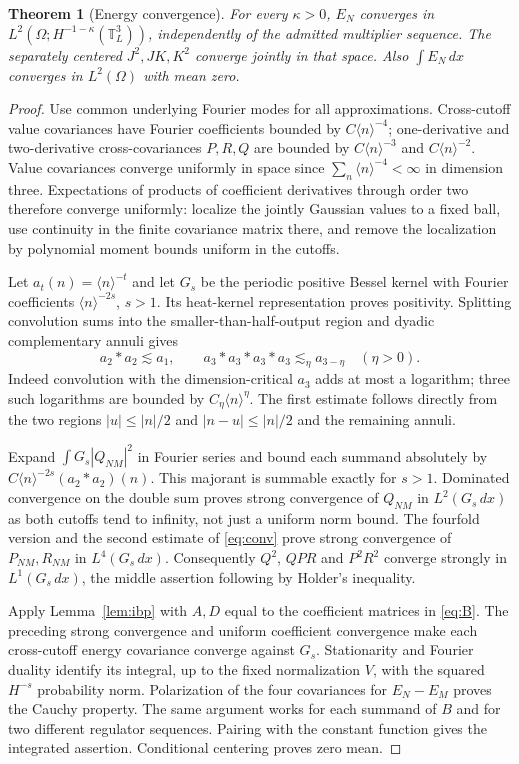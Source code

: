 \documentclass[11pt]{article}
\newtheorem{theorem}{Theorem}[section]
\newcommand{\T}{\mathbb T}
\newcommand{\la}[1]{\langle #1\rangle}
\begin{document}
\begin{theorem}[Energy convergence]\label{thm:energy}
For every $\kappa>0$, $E_N$ converges in
$L^2(\Omega;H^{-1-\kappa}(\T_L^3))$, independently of the admitted
multiplier sequence. The separately centered $J^2,JK,K^2$ converge jointly
in that space. Also $\int E_N\,dx$ converges in $L^2(\Omega)$ with mean zero.
\end{theorem}
\begin{proof}
Use common underlying Fourier modes for all approximations. Cross-cutoff
value covariances have Fourier coefficients bounded by $C\la n^{-4}$;
one-derivative and two-derivative cross-covariances $P,R,Q$ are bounded by
$C\la n^{-3}$ and $C\la n^{-2}$. Value covariances converge uniformly
in space since $\sum_n\la n^{-4}<\infty$ in dimension three.
Expectations of products of coefficient derivatives through order two
therefore converge uniformly: localize the jointly Gaussian values to a
fixed ball, use continuity in the finite covariance matrix there, and remove
the localization by polynomial moment bounds uniform in the cutoffs.

Let $a_t(n)=\la n^{-t}$ and let $G_s$ be the periodic positive Bessel kernel
with Fourier coefficients $\la n^{-2s}$, $s>1$.
Its heat-kernel representation proves positivity. Splitting convolution
sums into the smaller-than-half-output region and dyadic complementary
annuli gives
\begin{equation}\label{eq:conv}
 a_2*a_2\lesssim a_1,\qquad
 a_3*a_3*a_3*a_3\lesssim_\eta a_{3-\eta}\quad(\eta>0).
\end{equation}
Indeed convolution with the dimension-critical $a_3$ adds at most a
logarithm; three such logarithms are bounded by $C_\eta\la n^\eta$.
The first estimate follows directly from the two regions
$|u|\le|n|/2$ and $|n-u|\le|n|/2$ and the remaining annuli.

Expand $\int G_s|Q_{NM}|^2$ in Fourier series and bound each summand
absolutely by $C\la n^{-2s}(a_2*a_2)(n)$.
This majorant is summable exactly for $s>1$. Dominated convergence on the
double sum proves strong convergence of $Q_{NM}$ in $L^2(G_s\,dx)$ as
both cutoffs tend to infinity, not just a uniform norm bound.
The fourfold version and the second estimate of \eqref{eq:conv} prove strong
convergence of $P_{NM},R_{NM}$ in $L^4(G_s\,dx)$.
Consequently $Q^2$, $QPR$ and $P^2R^2$ converge strongly in $L^1(G_s\,dx)$,
the middle assertion following by Holder's inequality.

Apply Lemma~\ref{lem:ibp} with $A,D$ equal to the coefficient matrices in
\eqref{eq:B}. The preceding strong convergence and uniform coefficient
convergence make each cross-cutoff energy covariance converge against $G_s$.
Stationarity and Fourier duality identify its integral, up to the fixed
normalization $V$, with the squared $H^{-s}$ probability norm.
Polarization of the four covariances for $E_N-E_M$ proves the Cauchy
property. The same argument works for each summand of $B$ and for two
different regulator sequences. Pairing with the constant function gives
the integrated assertion. Conditional centering proves zero mean.
\end{proof}
\end{document}
